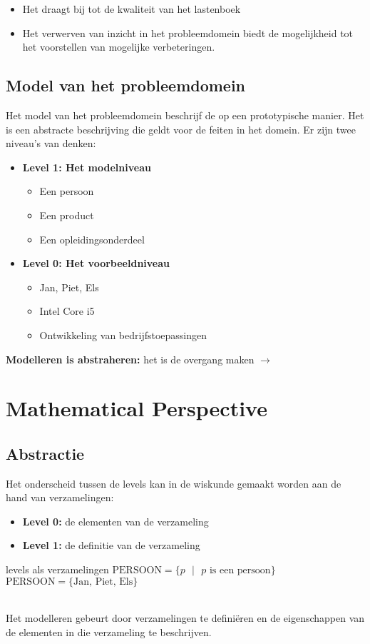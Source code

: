 \documentclass[../main.tex]{subfiles}
\begin{document}
\begin{itemize}
	\item Het draagt bij tot de kwaliteit van het lastenboek
	\item Het verwerven van inzicht in het probleemdomein biedt de mogelijkheid tot het voorstellen van mogelijke verbeteringen.
\end{itemize}

\subsection{Model van het probleemdomein}
Het model van het probleemdomein beschrijf de  op een prototypische manier. Het is een abstracte beschrijving die geldt voor de feiten in het domein. Er zijn twee niveau's van denken:
\begin{itemize}
	\item \textbf{Level 1: Het modelniveau}
	\begin{itemize}
		\item Een persoon
		\item Een product
		\item Een opleidingsonderdeel
	\end{itemize}
	\item \textbf{Level 0: Het voorbeeldniveau}
	\begin{itemize}
		\item Jan, Piet, Els
		\item Intel Core i5
		\item Ontwikkeling van bedrijfstoepassingen
	\end{itemize}
\end{itemize}
\textbf{Modelleren is abstraheren:} het is de overgang maken  $\rightarrow$ 
\section{Mathematical Perspective}
\subsection{Abstractie}
Het onderscheid tussen de levels kan in de wiskunde gemaakt worden aan de hand van verzamelingen:
\begin{itemize}
	\item \textbf{Level 0:} de elementen van de verzameling
	\item \textbf{Level 1:} de definitie van de verzameling
\end{itemize}
\begin{ex}{levels als verzamelingen}
$\textrm{PERSOON} = \{p \textrm{ }|\textrm{ } p \textrm{ is een persoon}\}$\\
$\textrm{PERSOON} = \{\textrm{Jan, Piet, Els}\}$
\end{ex}
\\
Het modelleren gebeurt door verzamelingen te defini\"eren en de eigenschappen van de elementen in die verzameling te beschrijven.
\end{document}
